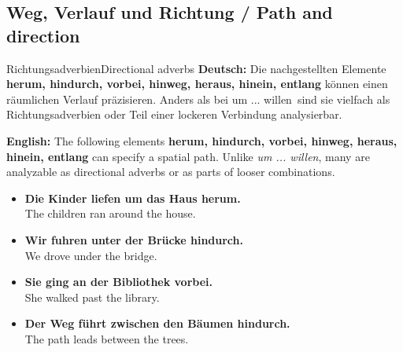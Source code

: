 \documentclass[a4paper,11pt]{article}
\newcommand{\GermanText}[1]{\textbf{Deutsch: }#1\par}
\newcommand{\EnglishText}[1]{{\small\color{SoftGray}\textbf{English: }#1\par}}
\newcommand{\ExampleItem}[2]{\item \textbf{#1}\\{\small\color{SoftGray}#2}}
\begin{document}
\subsection{Weg, Verlauf und Richtung / Path and direction}
\begin{grammarentry}{Richtungsadverbien}{Directional adverbs}
\GermanText{Die nachgestellten Elemente \textbf{herum, hindurch, vorbei, hinweg, heraus, hinein, entlang} können einen räumlichen Verlauf präzisieren. Anders als bei \glqq um ... willen\grqq\ sind sie vielfach als Richtungsadverbien oder Teil einer lockeren Verbindung analysierbar.}
\EnglishText{The following elements \textbf{herum, hindurch, vorbei, hinweg, heraus, hinein, entlang} can specify a spatial path. Unlike \emph{um ... willen}, many are analyzable as directional adverbs or as parts of looser combinations.}
\end{grammarentry}
\begin{exbox}\begin{itemize}
\ExampleItem{Die Kinder liefen um das Haus herum.}{The children ran around the house.}
\ExampleItem{Wir fuhren unter der Brücke hindurch.}{We drove under the bridge.}
\ExampleItem{Sie ging an der Bibliothek vorbei.}{She walked past the library.}
\ExampleItem{Der Weg führt zwischen den Bäumen hindurch.}{The path leads between the trees.}
\end{itemize}\end{exbox}
\end{document}
